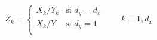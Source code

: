 \begin{equation*}
Z_k = %
\begin{cases}
X_k/Y_k & \text{si } d_y = d_x\\
X_k/Y & \text{si } d_y = 1\\
\end{cases}
\qquad k=1, d_x
\end{equation*}
